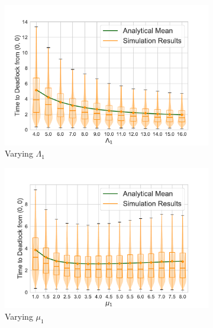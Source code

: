 \documentclass{article}
\numberwithin{equation}{section}
\begin{document}
\begin{figure}[!htbp]
  \begin{center}
  \begin{subfigure}[b]{0.48\textwidth}
    \includegraphics[width=\textwidth]{images/2Nms_varyL1}
    \caption{Varying $\Lambda_1$}
    \label{fig:2Nms_L}
  \end{subfigure}
  \begin{subfigure}[b]{0.48\textwidth}
    \includegraphics[width=\textwidth]{images/2Nms_varymu1}
    \caption{Varying $\mu_1$}
    \label{fig:2Nms_mu}
  \end{subfigure}\\
  \begin{subfigure}[b]{0.48\textwidth}

\end{subfigure}
\end{center}
\end{figure}
\end{document}
